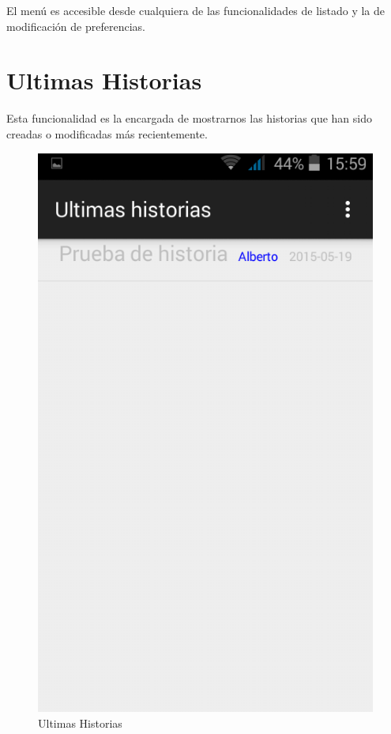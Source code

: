 \documentclass[11pt,a4paper, titlepage]{article}
\begin{document}
	El menú es accesible desde cualquiera de las funcionalidades de listado y la de modificación de preferencias.
	
	\FloatBarrier
	\section[Ultimas Historias]{Ultimas Historias}
	
	Esta funcionalidad es la encargada de mostrarnos las historias que han sido creadas o modificadas más recientemente.
	
	\begin{figure}[hbtp]
		\centering
		\includegraphics[scale = 0.25 ]{img/4}
		\caption{Ultimas Historias}
		\label{p11}
	\end{figure}
	
\end{document}
